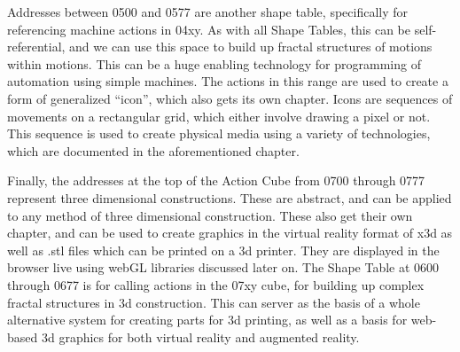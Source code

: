 Addresses between 0500 and 0577 are another shape table, specifically for referencing machine actions in 04xy.  As with all Shape Tables, this can be self-referential, and we can use this space to build up fractal structures of motions within motions.  This can be a huge enabling technology for programming of automation using simple machines.  The actions in this range are used to create a form of generalized ``icon'', which also gets its own chapter.  Icons are sequences of movements on a rectangular grid, which either involve drawing a pixel or not.  This sequence is used to create physical media using a variety of technologies, which are documented in the aforementioned chapter.  

Finally, the addresses at the top of the Action Cube from 0700 through 0777 represent three dimensional constructions.  These are abstract, and can be applied to any method of three dimensional construction.  These also get their own chapter, and can be used to create graphics in the virtual reality format of x3d as well as .stl files which can be printed on a 3d printer.  They are displayed in the browser live using webGL libraries discussed later on.  The Shape Table at 0600 through 0677 is for calling actions in the 07xy cube, for building up complex fractal structures in 3d construction.  This can server as the basis of a whole alternative system for creating parts for 3d printing, as well as a basis for web-based 3d graphics for both virtual reality and augmented reality.
   
